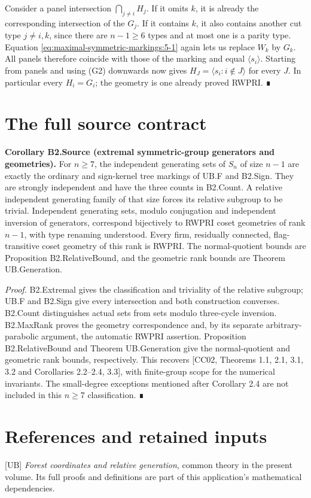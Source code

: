 Consider a panel intersection \(\bigcap_{j\ne i}H_j\). If it omits \(k\), it is already the corresponding intersection of the \(G_j\). If it contains \(k\), it also contains another cut type \(j\ne i,k\), since there are \(n-1\geq6\) types and at most one is a parity type. Equation \eqref{eq:maximal-symmetric-markings:5-1} again lets us replace \(W_k\) by \(G_k\). All panels therefore coincide with those of the marking and equal \(\langle s_i\rangle\). Starting from panels and using (G2) downwards now gives \(H_J=\langle s_i:i\notin J\rangle\) for every \(J\). In particular every \(H_i=G_i\); the geometry is one already proved RWPRI. ∎
\section{The full source contract}
\textbf{Corollary B2.Source (extremal symmetric-group generators and geometries).} For \(n\geq7\), the independent generating sets of \(S_n\) of size \(n-1\) are exactly the ordinary and sign-kernel tree markings of UB.F and B2.Sign. They are strongly independent and have the three counts in B2.Count. A relative independent generating family of that size forces its relative subgroup to be trivial. Independent generating sets, modulo conjugation and independent inversion of generators, correspond bijectively to RWPRI coset geometries of rank \(n-1\), with type renaming understood. Every firm, residually connected, flag-transitive coset geometry of this rank is RWPRI. The normal-quotient bounds are Proposition B2.RelativeBound, and the geometric rank bounds are Theorem UB.Generation.

\emph{Proof.} B2.Extremal gives the classification and triviality of the relative subgroup; UB.F and B2.Sign give every intersection and both construction converses. B2.Count distinguishes actual sets from sets modulo three-cycle inversion. B2.MaxRank proves the geometry correspondence and, by its separate arbitrary-parabolic argument, the automatic RWPRI assertion. Proposition B2.RelativeBound and Theorem UB.Generation give the normal-quotient and geometric rank bounds, respectively. This recovers {[}CC02, Theorems 1.1, 2.1, 3.1, 3.2 and Corollaries 2.2--2.4, 3.3{]}, with finite-group scope for the numerical invariants. The small-degree exceptions mentioned after Corollary 2.4 are not included in this \(n\geq7\) classification. ∎

\section*{References and retained inputs}
{[}UB{]} \emph{Forest coordinates and relative generation}, common theory in the present volume. Its full proofs and definitions are part of this application's mathematical dependencies.

